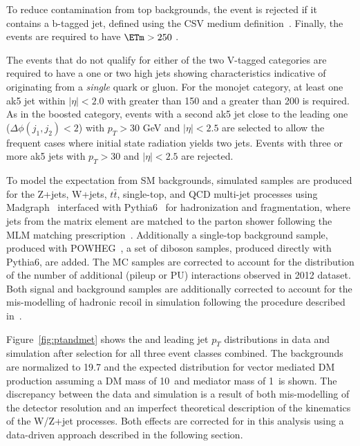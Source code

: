 To reduce contamination from top backgrounds, the event is rejected if it contains a 
b-tagged jet, defined using the CSV medium definition~\cite{BTAG}. Finally, the events are required to 
have $\ETm>250$ \gev. 

The events that do not qualify for either of the two V-tagged categories are required to have a one or two high \pt jets showing characteristics indicative of originating from a \emph{single} quark or gluon. 
For the monojet category, at least one ak5 jet within $|\eta|<2.0$ with \pt greater 
than 150 \gev and a \ETm greater than 200 \gev is required.  
As in the boosted category, events with a second ak5 jet close to the leading one ($\Delta\phi(j_1,j_2) < 2$) 
with $p_T>30$ GeV and $|\eta|<2.5$ are selected to allow the frequent cases where initial state radiation yields two jets.
Events with three or more ak5 jets with $p_T>30$ \gev and $|\eta|<2.5$ are rejected.

To model the expectation from SM backgrounds, simulated samples are produced for the
Z+jets, W+jets, $t\bar{t}$, single-top, and QCD multi-jet processes
using Madgraph~\cite{amcatnlo} interfaced with Pythia6~\cite{Sjostrand:2006za} for hadronization and
fragmentation, where jets from the matrix element are matched to the parton shower following the MLM matching prescription~\cite{Mangano:2006rw}.
Additionally a single-top background sample, produced with
POWHEG~\cite{powheg},  a set of diboson samples, produced directly
with Pythia6, are added. 
The MC samples are corrected to account for the distribution of the number of additional (pileup or PU) interactions
observed in 2012 dataset. Both signal and background samples are additionally corrected to account for the mis-modelling of hadronic recoil in simulation following
the procedure described in~\cite{CMS-PAS-JME-12-002}.


Figure~\ref{fig:ptandmet} shows the \ETm and leading jet $p_{T}$ distributions in data and 
simulation after selection for all three event classes combined. The backgrounds are normalized to 19.7\fbinv 
and the expected distribution for vector mediated DM production assuming a DM mass of 10~\GeV and mediator mass of 1~\TeV is shown. 
The discrepancy between the data and simulation is a result of both mis-modelling of the 
detector resolution and an imperfect theoretical description of the kinematics of the W/Z+jet processes. 
Both effects are corrected for in this analysis using a data-driven approach described in the following section. 

